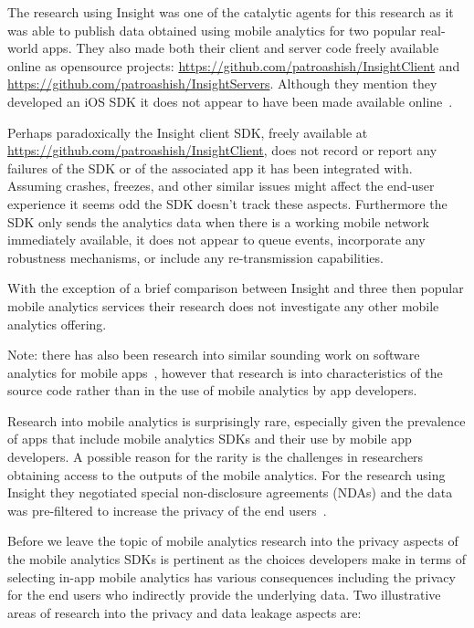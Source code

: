 The research using Insight was one of the catalytic agents for this research as it was able to publish data obtained using mobile analytics for two popular real-world apps. They also made both their client and server code freely available online as opensource projects: \url{https://github.com/patroashish/InsightClient} and \url{https://github.com/patroashish/InsightServers}. Although they mention they developed an iOS SDK it does not appear to have been made available online~\cite[p. 85]{patro2015_building_blocks_to_understand_wireless_experience}.

Perhaps paradoxically the Insight client SDK, freely available at \url{https://github.com/patroashish/InsightClient}, does not record or report any failures of the SDK or of the associated app it has been integrated with. Assuming crashes, freezes, and other similar issues might affect the end-user experience it seems odd the SDK doesn't track these aspects. Furthermore the SDK only sends the analytics data when there is a working mobile network immediately available, it does not appear to queue events, incorporate any robustness mechanisms, or include any re-transmission capabilities.

With the exception of a brief comparison between Insight and three then popular mobile analytics services their research does not investigate any other mobile analytics offering.

Note: there has also been research into similar sounding work on software analytics for mobile apps~\textcite{minelli2013_software_analytics_samoa}, however that research is into characteristics of the source code rather than in the use of mobile analytics by app developers.

Research into mobile analytics is surprisingly rare, especially given the prevalence of apps that include mobile analytics SDKs and their use by mobile app developers. A possible reason for the rarity is the challenges in researchers obtaining access to the outputs of the mobile analytics. For the research using Insight they negotiated special non-disclosure agreements (NDAs) and the data was pre-filtered to increase the privacy of the end users~\cite[p. 91]{patro2015_building_blocks_to_understand_wireless_experience}. 

Before we leave the topic of mobile analytics research into the privacy aspects of the mobile analytics SDKs is pertinent as the choices developers make in terms of selecting in-app mobile analytics has various consequences including the privacy for the end users who indirectly provide the underlying data. Two illustrative areas of research into the privacy and data leakage aspects are:

